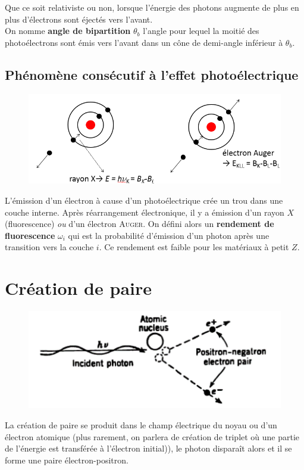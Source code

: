 Que ce soit relativiste ou non, lorsque l'énergie des photons augmente de plus en plus d'électrons
sont éjectés vers l'avant. \\

On nomme \textbf{angle de bipartition} $\theta_b$ l'angle pour lequel la moitié des photoélectrons
sont émis vers l'avant dans un cône de demi-angle inférieur à $\theta_b$.



\subsection{Phénomène consécutif à l'effet photoélectrique}%
	\begin{figure}
	\vspace{-5mm}
	\includegraphics[scale=0.5]{ch4/image11}
	\end{figure}
L'émission d'un électron à cause d'un photoélectrique crée un trou dans une couche interne. Après
réarrangement électronique, il y a émission d'un rayon $X$ (fluorescence) \textit{ou} d'un électron
\textsc{Auger}. On défini alors un \textbf{rendement de fluorescence} $\omega_i$ qui est la 
probabilité d'émission d'un photon après une transition vers la couche $i$. Ce rendement est faible
pour les matériaux à petit $Z$.


\section{Création de paire}%
	\begin{figure}
	\vspace{-5mm}
	\includegraphics[scale=0.5]{ch4/image12}
	\end{figure}
La création de paire se produit dans le champ électrique du noyau ou d'un électron atomique (plus 
rarement, on parlera de création de triplet où une partie de l'énergie est transférée à l'électron
initial)), le photon disparaît alors et il se forme une paire
électron-positron. 

